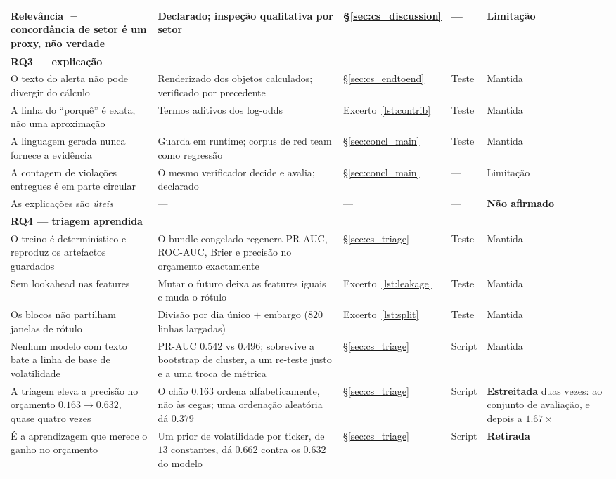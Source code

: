 \begin{table}[ht]
\begin{tabular}{p{4.6cm} p{3.5cm} p{1.6cm} p{1.2cm} p{1.7cm}}
Relevância $=$ concordância de setor é um proxy, não verdade & Declarado; inspeção qualitativa por setor & §\ref{sec:cs_discussion} & --- & Limitação \\
\midrule
\multicolumn{5}{l}{\textbf{RQ3 — explicação}} \\
O texto do alerta não pode divergir do cálculo & Renderizado dos objetos calculados; verificado por precedente & §\ref{sec:cs_endtoend} & Teste & Mantida \\
A linha do ``porquê'' é exata, não uma aproximação & Termos aditivos dos log-odds & Excerto~\ref{lst:contrib} & Teste & Mantida \\
A linguagem gerada nunca fornece a evidência & Guarda em runtime; corpus de red team como regressão & §\ref{sec:concl_main} & Teste & Mantida \\
A contagem de violações entregues é em parte circular & O mesmo verificador decide e avalia; declarado & §\ref{sec:concl_main} & --- & Limitação \\
As explicações são \emph{úteis} & --- & --- & --- & \textbf{Não afirmado} \\
\midrule
\multicolumn{5}{l}{\textbf{RQ4 — triagem aprendida}} \\
O treino é determinístico e reproduz os artefactos guardados & O bundle congelado regenera PR-AUC, ROC-AUC, Brier e precisão no orçamento exactamente & §\ref{sec:cs_triage} & Teste & Mantida \\
Sem lookahead nas features & Mutar o futuro deixa as features iguais e muda o rótulo & Excerto~\ref{lst:leakage} & Teste & Mantida \\
Os blocos não partilham janelas de rótulo & Divisão por dia único $+$ embargo ($820$ linhas largadas) & Excerto~\ref{lst:split} & Teste & Mantida \\
Nenhum modelo com texto bate a linha de base de volatilidade & PR-AUC $0.542$ vs $0.496$; sobrevive a bootstrap de cluster, a um re-teste justo e a uma troca de métrica & §\ref{sec:cs_triage} & Script & Mantida \\
A triagem eleva a precisão no orçamento $0.163 \to 0.632$, quase quatro vezes & O chão $0.163$ ordena alfabeticamente, não às cegas; uma ordenação aleatória dá $0.379$ & §\ref{sec:cs_triage} & Script & \textbf{Estreitada} duas vezes: ao conjunto de avaliação, e depois a $1.67\times$ \\
É a aprendizagem que merece o ganho no orçamento & Um prior de volatilidade por ticker, de $13$ constantes, dá $0.662$ contra os $0.632$ do modelo & §\ref{sec:cs_triage} & Script & \textbf{Retirada} \\

\end{tabular}
\end{table}
